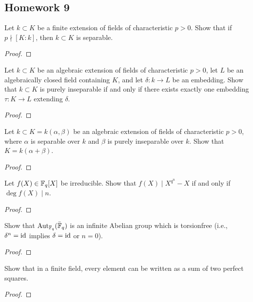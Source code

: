 \subsection{Homework 9}
\begin{problem}
  Let $k\subset K$ be a finite extension of fields of characteristic
  $p>0$. Show that if $p\nmid[K:k]$, then $k\subset K$ is separable.
\end{problem}
\begin{proof}
\end{proof}

\begin{problem}
  Let $k\subset K$ be an algebraic extension of fields of characteristic
  $p>0$, let $L$ be an algebraically closed field containing $K$, and let
  $\delta\colon k\to L$ be an embedding. Show that $k\subset K$ is purely
  inseparable if and only if there exists exactly one embedding
  $\tau\colon K\to L$ extending $\delta$.
\end{problem}
\begin{proof}
\end{proof}

\begin{problem}
  Let $k\subset K=k(\alpha,\beta)$ be an algebraic extension of fields of
  characteristic $p>0$, where $\alpha$ is separable over $k$ and $\beta$ is
  purely inseparable over $k$. Show that $K=k(\alpha+\beta)$.
\end{problem}
\begin{proof}
\end{proof}

\begin{problem}
  Let $f(X)\in\mathbb{F}_q[X]$ be irreducible. Show that $f(X)\mid X^{q^n}-X$ if
  and only if $\deg f(X)\mid n$.
\end{problem}
\begin{proof}
\end{proof}

\begin{problem}
  Show that $\operatorname{Aut}_{\mathbb{F}_q}(\bar{\mathbb{F}}_q)$ is an infinite Abelian group which
  is torsionfree (i.e., $\delta^n=\operatorname{id}$ implies $\delta=\operatorname{id}$ or $n=0$).
\end{problem}
\begin{proof}
\end{proof}

\begin{problem}
  Show that in a finite field, every element can be written as a sum of two
  perfect squares.
\end{problem}
\begin{proof}
\end{proof}

